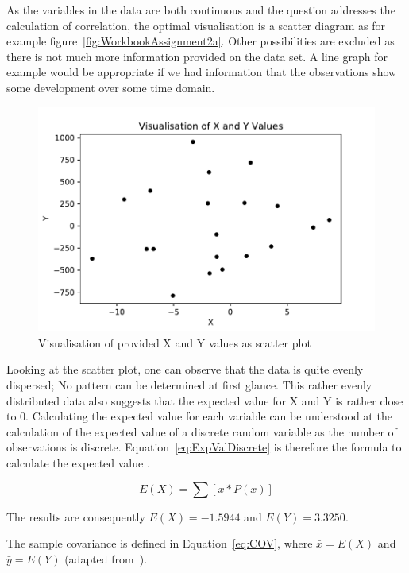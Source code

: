 As the variables in the data are both continuous and the question addresses the calculation of correlation, the optimal visualisation is a scatter diagram as for example figure~\eqref{fig:WorkbookAssignment2a}. Other possibilities are excluded as there is not much more information provided on the data set. A line graph for example would be appropriate if we had information that the observations show some development over some time domain. 

\begin{figure}[h]
\centering
\includegraphics[width=16cm]{pics/WorkbookAssignment2a.pdf}
\caption{Visualisation of provided X and Y values as scatter plot}
\label{fig:WorkbookAssignment2a}
\end{figure}
\FloatBarrier

Looking at the scatter plot, one can observe that the data is quite evenly dispersed; No pattern can be determined at first glance. This rather evenly distributed data also suggests that the expected value for X and Y is rather close to 0. Calculating the expected value for each variable can be understood at the calculation of the expected value of a discrete random variable as the number of observations is discrete. Equation~\eqref{eq:ExpValDiscrete} is therefore the formula to calculate the expected value \cite{mathcenter}. 


\begin{equation}  
E(X) = \sum \left[x * P(x)\right]
\label{eq:ExpValDiscrete}
\end{equation}

The results are consequently $E(X) = -1.5944$ and $E(Y) = 3.3250$.

The sample covariance is defined in Equation~\eqref{eq:COV}, where $\bar{x} = E(X)$ and $\bar{y} = E(Y)$ (adapted from~\cite{bruce2017practical}).

